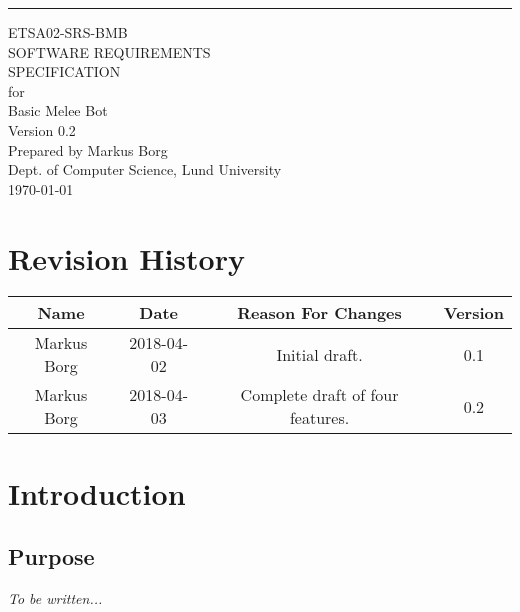 \documentclass{scrreprt}
\date{}
\def\myversion{0.2 }
\begin{document}
\begin{flushright}
    \rule{16cm}{5pt}\vskip1cm
    \begin{bfseries}
    	\LARGE{ETSA02-SRS-BMB}\\
    	\vspace{1.5cm}
        \Huge{SOFTWARE REQUIREMENTS\\ SPECIFICATION}\\
        \vspace{0.5cm}
        for\\
        \vspace{0.5cm}
        Basic Melee Bot\\
        \vspace{1.5cm}
        \LARGE{Version \myversion}\\
        \vspace{1.5cm}
        Prepared by Markus Borg\\
        Dept. of Computer Science, Lund University\\
        \vspace{1.5cm}
        \today\\
    \end{bfseries}
\end{flushright}

\tableofcontents


\chapter*{Revision History}

\begin{center}
    \begin{tabular}{|c|c|c|c|}
        \hline
	    Name & Date & Reason For Changes & Version\\
        \hline
	    Markus Borg & 2018-04-02 & Initial draft. & 0.1\\
        \hline
        Markus Borg & 2018-04-03 & Complete draft of four features. & 0.2\\
        \hline
    \end{tabular}
\end{center}

\chapter{Introduction}

\section{Purpose}
\textit{To be written...}\\
\end{document}
